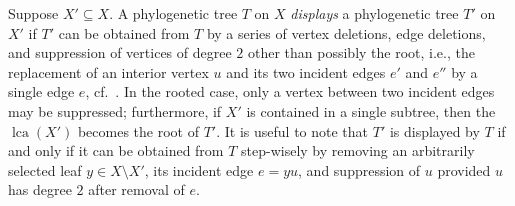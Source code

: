 \documentclass[smallextended]{svjour3}
\let\cite\citep
\newcommand{\rev}[1]{\begingroup\color{blue}#1\endgroup}
\newcommand{\lca}[1]{\mathop{lca}(#1)}
\begin{document}
Suppose $X'\subseteq X$. A phylogenetic tree $T$ on $X$ \emph{displays} a
phylogenetic tree $T'$ on $X'$ if $T'$ can be obtained from $T$ by a series
of vertex deletions, edge deletions, and suppression of vertices of degree
$2$ other than possibly the root, i.e., the replacement of an interior
vertex $u$ and its two incident edges $e'$ and $e''$ by a single edge $e$,
cf.\ \cite[Def.\ 6.1.2]{sem-ste-03a}. In the rooted case, only a vertex
between two 
\rev{incident} edges 
may be suppressed;
furthermore, if $X'$ is contained in a single subtree, then the $\lca{X'}$
becomes the root of $T'$. It is useful to note that $T'$ is displayed by
$T$ if and only if it can be obtained from $T$ step-wisely by removing an
arbitrarily selected leaf $y\in X\setminus X'$, its incident edge $e=yu$,
and suppression of $u$ provided $u$ has degree $2$ after removal of $e$.
\end{document}
